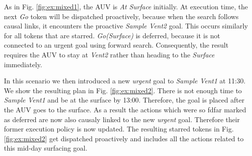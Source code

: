 As in Fig. \ref{fig:ex:mixed1}, the AUV is {\em At Surface} initially.
At execution time, the next {\em Go} token will be dispatched
proactively, because when the search follows causal links, it
encounters the proactive {\em Sample Vent2} goal.  This occurs
similarly for all tokens that are starred. {\em Go(Surface)} is
deferred, because it is not connected to an urgent goal using forward
search. Consequently, the result requires the AUV to stay at {\em
  Vent2} rather than heading to the {\em Surface} immediately.


In this scenario we then introduced a new {\em urgent} goal to {\em
  Sample Vent1} at 11:30. We show the resulting plan in
Fig. \ref{fig:ex:mixed2}. There is not enough time to {\em Sample
  Vent1} and be at the surface by 13:00. Therefore, the goal is placed
after the AUV goes to the surface. As a result the actions which were
so fdfar marked as deferred are now also causaly linked to the new
{\em urgent} goal. Therefore their former execution policy is now
updated. The resulting starred tokens in Fig. \ref{fig:ex:mixed2} get
dispatched proactively and includes all the actions related to this
mid-day surfacing goal.

